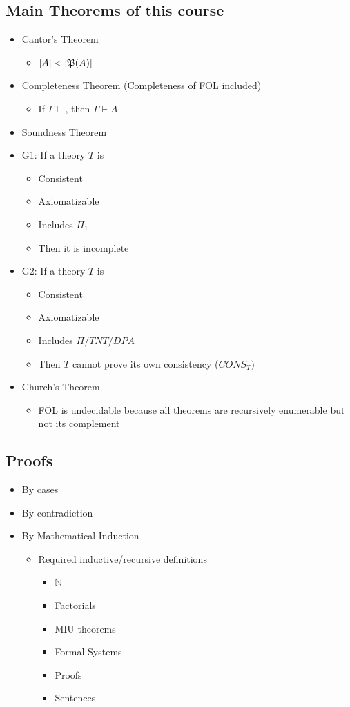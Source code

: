 \documentclass[11pt]{article}
\begin{document}
\subsection{Main Theorems of this course}
\label{sec:orgb0a05ea}
\begin{itemize}
\item Cantor's Theorem
\begin{itemize}
\item \(|A|<|\frak{P}(A)|\)
\end{itemize}
\item Completeness Theorem (Completeness of FOL included)
\begin{itemize}
\item If \(\Gamma \models\), then \(\Gamma \vdash A\)
\end{itemize}
\item Soundness Theorem
\item G1: If a theory \(T\) is
\begin{itemize}
\item Consistent
\item Axiomatizable
\item Includes \(\Pi_1\)
\item Then it is incomplete
\end{itemize}
\item G2: If a theory \(T\) is
\begin{itemize}
\item Consistent
\item Axiomatizable
\item Includes \(\Pi/TNT/DPA\)
\item Then \(T\) cannot prove its own consistency (\(CONS_T)\)
\end{itemize}
\item Church's Theorem
\begin{itemize}
\item FOL is undecidable because all theorems are recursively enumerable but not its complement
\end{itemize}
\end{itemize}
\subsection{Proofs}
\label{sec:org906293a}
\begin{itemize}
\item By cases
\item By contradiction
\item By Mathematical Induction
\begin{itemize}
\item Required inductive/recursive definitions
\begin{itemize}
\item \(\mathbb{N}\)
\item Factorials
\item MIU theorems
\item Formal Systems
\item Proofs
\item Sentences
\end{itemize}
\end{itemize}
\end{itemize}
\end{document}
